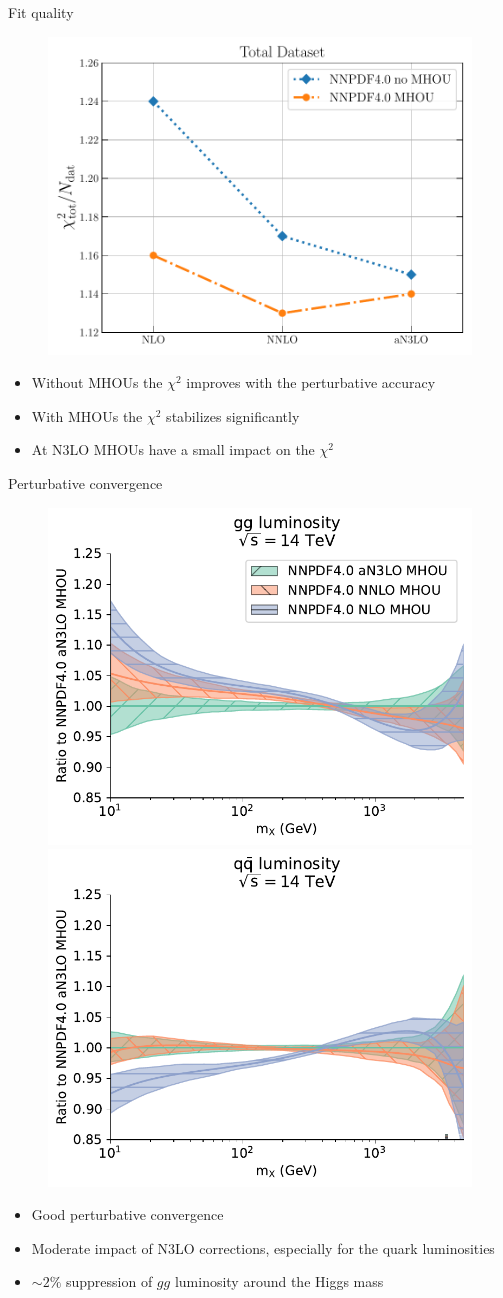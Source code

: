 \documentclass[8pt,t]{beamer}
\begin{document}
\begin{frame}{Fit quality}
  \begin{figure}[!t]
    \includegraphics[width=.4\textwidth]{figures/chi2_n3lo_summary.pdf}
  \end{figure}
  \begin{itemize}
    \item Without MHOUs the $\chi^2$ improves with the perturbative accuracy
    \item With MHOUs the $\chi^2$ stabilizes significantly
    \item At N3LO MHOUs have a small impact on the $\chi^2$
  \end{itemize}
\end{frame}

\begin{frame}{Perturbative convergence}
  \begin{figure}[!t]
    \includegraphics[width=.4\textwidth]{figures/gg_plot_lumi1d_convergence.pdf}
    \includegraphics[width=.4\textwidth]{figures/qqbar_plot_lumi1d_convergence.pdf}
  \end{figure}
  \begin{itemize}
    \item Good perturbative convergence
    \item Moderate impact of N3LO corrections, especially for the quark luminosities
    \item $\sim2\%$ suppression of $gg$ luminosity around the Higgs mass
  \end{itemize}
\end{frame}
\end{document}
